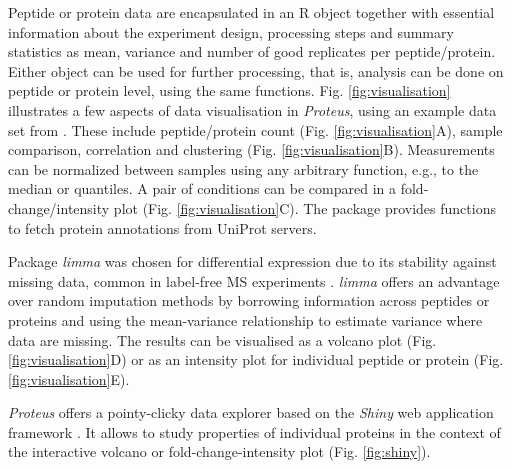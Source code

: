 \documentclass[]{article}
\begin{document}
Peptide or protein data are encapsulated in an R object together with
essential information about the experiment design, processing steps and
summary statistics as mean, variance and number of good replicates per
peptide/protein. Either object can be used for further processing, that
is, analysis can be done on peptide or protein level, using the same
functions. Fig. \ref{fig:visualisation} illustrates a few aspects of
data visualisation in \emph{Proteus}, using an example data set from
\citep{trunk2018}. These include peptide/protein count (Fig.
\ref{fig:visualisation}A), sample comparison, correlation and clustering
(Fig. \ref{fig:visualisation}B). Measurements can be normalized between
samples using any arbitrary function, e.g., to the median or quantiles.
A pair of conditions can be compared in a fold-change/intensity plot
(Fig. \ref{fig:visualisation}C). The package provides functions to fetch
protein annotations from UniProt servers.

Package \emph{limma} was chosen for differential expression due to its
stability against missing data, common in label-free MS experiments
\citep{lazar2016}. \emph{limma} offers an advantage over random
imputation methods by borrowing information across peptides or proteins
and using the mean-variance relationship to estimate variance where data
are missing. The results can be visualised as a volcano plot (Fig.
\ref{fig:visualisation}D) or as an intensity plot for individual peptide
or protein (Fig. \ref{fig:visualisation}E).

\emph{Proteus} offers a pointy-clicky data explorer based on the
\emph{Shiny} web application framework \citep{shiny}. It allows to study
properties of individual proteins in the context of the interactive
volcano or fold-change-intensity plot (Fig. \ref{fig:shiny}).
\end{document}

